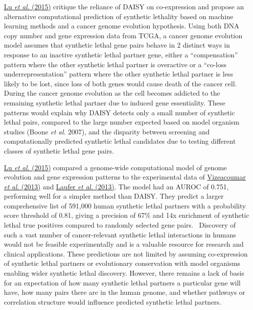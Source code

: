 \hyperlink{ENREF74}{Lu}\hyperlink{ENREF74}{\textit{ et al.}}\hyperlink{ENREF74}{ (2015)} critique the reliance of DAISY on co-expression and propose an alternative computational prediction of synthetic lethality based on machine learning methods and a cancer genome evolution hypothesis. Using both DNA copy number and gene expression data from TCGA, a cancer genome evolution model assumes that synthetic lethal gene pairs behave in 2 distinct ways in response to an inactive synthetic lethal partner gene, either a ``compensation'' pattern where the other synthetic lethal partner is overactive or a ``co-loss underrepresentation'' pattern where the other synthetic lethal partner is less likely to be lost, since loss of both genes would cause death of the cancer cell. During the cancer genome evolution as the cell becomes addicted to the remaining synthetic lethal partner due to induced gene essentiality. These patterns would explain why DAISY detects only a small number of synthetic lethal pairs, compared to the large number expected based on model organism studies (Boone\textit{ et al.} 2007), and the disparity between screening and computationally predicted synthetic lethal candidates due to testing different classes of synthetic lethal gene pairs. 

\hyperlink{ENREF74}{Lu}\hyperlink{ENREF74}{\textit{ et al.}}\hyperlink{ENREF74}{ (2015)} compared a genome-wide computational model of genome evolution and gene expression patterns to the experimental data of \hyperlink{ENREF108}{Vizeacoumar}\hyperlink{ENREF108}{\textit{ et al.}}\hyperlink{ENREF108}{ (2013)} and \hyperlink{ENREF60}{Laufer}\hyperlink{ENREF60}{\textit{ et al.}}\hyperlink{ENREF60}{ (2013)}. The model had an AUROC of 0.751, performing well for a simpler method than DAISY. They predict a larger comprehensive list of 591,000 human synthetic lethal partners with a probability score threshold of 0.81, giving a precision of 67\% and 14x enrichment of synthetic lethal true positives compared to randomly selected gene pairs. \ Discovery of such a vast number of cancer-relevant synthetic lethal interactions in humans would not be feasible experimentally and is a valuable resource for research and clinical applications. These predictions are not limited by assuming co-expression of synthetic lethal partners or evolutionary conservation with model organisms enabling wider synthetic lethal discovery. However, there remains a lack of basis for an expectation of how many synthetic lethal partners a particular gene will have, how many pairs there are in the human genome, and whether pathways or correlation structure would influence predicted synthetic lethal partners. 

